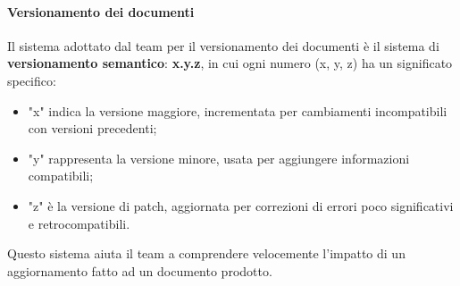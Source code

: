     \paragraph{Versionamento dei documenti}
    Il sistema adottato dal team per il versionamento dei documenti è il sistema di \textbf{versionamento semantico}: \textbf{x.y.z}, in cui ogni numero (x, y, z) ha un significato specifico:\\
    \begin{itemize}
    \item "x" indica la versione maggiore, incrementata per cambiamenti incompatibili con versioni precedenti;
    \item "y" rappresenta la versione minore, usata per aggiungere informazioni compatibili;
    \item "z" è la versione di patch, aggiornata per correzioni di errori poco significativi e retrocompatibili.
    \end{itemize} 
    Questo sistema aiuta il team a comprendere velocemente l'impatto di un aggiornamento fatto ad un documento prodotto.\\

